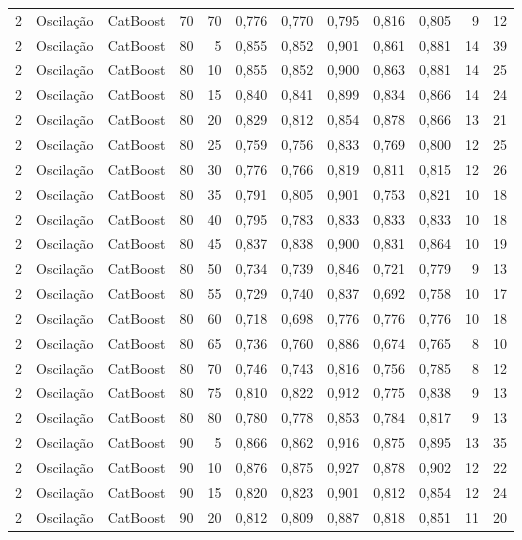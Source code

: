 \begin{longtable}{ccclrrrrrrrr}
2 & Oscilação & CatBoost & 70 & 70 & 0,776 & 0,770 & 0,795 & 0,816 & 0,805 & 9 & 12 \\
2 & Oscilação & CatBoost & 80 & 5 & 0,855 & 0,852 & 0,901 & 0,861 & 0,881 & 14 & 39 \\
2 & Oscilação & CatBoost & 80 & 10 & 0,855 & 0,852 & 0,900 & 0,863 & 0,881 & 14 & 25 \\
2 & Oscilação & CatBoost & 80 & 15 & 0,840 & 0,841 & 0,899 & 0,834 & 0,866 & 14 & 24 \\
2 & Oscilação & CatBoost & 80 & 20 & 0,829 & 0,812 & 0,854 & 0,878 & 0,866 & 13 & 21 \\
2 & Oscilação & CatBoost & 80 & 25 & 0,759 & 0,756 & 0,833 & 0,769 & 0,800 & 12 & 25 \\
2 & Oscilação & CatBoost & 80 & 30 & 0,776 & 0,766 & 0,819 & 0,811 & 0,815 & 12 & 26 \\
2 & Oscilação & CatBoost & 80 & 35 & 0,791 & 0,805 & 0,901 & 0,753 & 0,821 & 10 & 18 \\
2 & Oscilação & CatBoost & 80 & 40 & 0,795 & 0,783 & 0,833 & 0,833 & 0,833 & 10 & 18 \\
2 & Oscilação & CatBoost & 80 & 45 & 0,837 & 0,838 & 0,900 & 0,831 & 0,864 & 10 & 19 \\
2 & Oscilação & CatBoost & 80 & 50 & 0,734 & 0,739 & 0,846 & 0,721 & 0,779 & 9 & 13 \\
2 & Oscilação & CatBoost & 80 & 55 & 0,729 & 0,740 & 0,837 & 0,692 & 0,758 & 10 & 17 \\
2 & Oscilação & CatBoost & 80 & 60 & 0,718 & 0,698 & 0,776 & 0,776 & 0,776 & 10 & 18 \\
2 & Oscilação & CatBoost & 80 & 65 & 0,736 & 0,760 & 0,886 & 0,674 & 0,765 & 8 & 10 \\
2 & Oscilação & CatBoost & 80 & 70 & 0,746 & 0,743 & 0,816 & 0,756 & 0,785 & 8 & 12 \\
2 & Oscilação & CatBoost & 80 & 75 & 0,810 & 0,822 & 0,912 & 0,775 & 0,838 & 9 & 13 \\
2 & Oscilação & CatBoost & 80 & 80 & 0,780 & 0,778 & 0,853 & 0,784 & 0,817 & 9 & 13 \\
2 & Oscilação & CatBoost & 90 & 5 & 0,866 & 0,862 & 0,916 & 0,875 & 0,895 & 13 & 35 \\
2 & Oscilação & CatBoost & 90 & 10 & 0,876 & 0,875 & 0,927 & 0,878 & 0,902 & 12 & 22 \\
2 & Oscilação & CatBoost & 90 & 15 & 0,820 & 0,823 & 0,901 & 0,812 & 0,854 & 12 & 24 \\
2 & Oscilação & CatBoost & 90 & 20 & 0,812 & 0,809 & 0,887 & 0,818 & 0,851 & 11 & 20 \\

\end{longtable}
